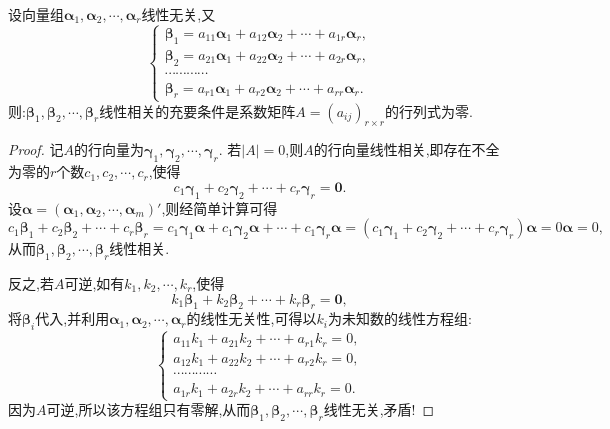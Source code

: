 \documentclass[../../main.tex]{subfiles}%
\begin{document}
\begin{proposition}\label{proposition:线性无关向量组的命题5}
设向量组\(\boldsymbol{\alpha}_1,\boldsymbol{\alpha}_2,\cdots,\boldsymbol{\alpha}_r\)线性无关,又
\[
\begin{cases}
\boldsymbol{\beta}_1 = a_{11}\boldsymbol{\alpha}_1 + a_{12}\boldsymbol{\alpha}_2+\cdots + a_{1r}\boldsymbol{\alpha}_r,\\
\boldsymbol{\beta}_2 = a_{21}\boldsymbol{\alpha}_1 + a_{22}\boldsymbol{\alpha}_2+\cdots + a_{2r}\boldsymbol{\alpha}_r,\\
\cdots\cdots\cdots\cdots\\
\boldsymbol{\beta}_r = a_{r1}\boldsymbol{\alpha}_1 + a_{r2}\boldsymbol{\alpha}_2+\cdots + a_{rr}\boldsymbol{\alpha}_r.
\end{cases}
\]
则:\(\boldsymbol{\beta}_1,\boldsymbol{\beta}_2,\cdots,\boldsymbol{\beta}_r\)线性相关的充要条件是系数矩阵\(A=(a_{ij})_{r\times r}\)的行列式为零.
\end{proposition}
\begin{proof}

记\(A\)的行向量为\(\boldsymbol{\gamma}_1,\boldsymbol{\gamma}_2,\cdots,\boldsymbol{\gamma}_r\). 若\(|A| = 0\),则\(A\)的行向量线性相关,即存在不全为零的\(r\)个数\(c_1,c_2,\cdots,c_r\),使得
\[
c_1\boldsymbol{\gamma}_1 + c_2\boldsymbol{\gamma}_2+\cdots + c_r\boldsymbol{\gamma}_r=\boldsymbol{0}.
\]
设$\boldsymbol{\alpha }=\left( \boldsymbol{\alpha }_1,\boldsymbol{\alpha }_2,\cdots ,\boldsymbol{\alpha }_m \right)'$,则经简单计算可得
\[
c_1\boldsymbol{\beta }_1+c_2\boldsymbol{\beta }_2+\cdots +c_r\boldsymbol{\beta }_r=c_1\boldsymbol{\gamma }_1\boldsymbol{\alpha }+c_1\boldsymbol{\gamma }_2\boldsymbol{\alpha }+\cdots +c_1\boldsymbol{\gamma }_r\boldsymbol{\alpha }=\left( c_1\boldsymbol{\gamma }_1+c_2\boldsymbol{\gamma }_2+\cdots +c_r\boldsymbol{\gamma }_r \right) \boldsymbol{\alpha }=0\boldsymbol{\alpha }=0,
\]
从而\(\boldsymbol{\beta}_1,\boldsymbol{\beta}_2,\cdots,\boldsymbol{\beta}_r\)线性相关.

反之,若\(A\)可逆,如有\(k_1,k_2,\cdots,k_r\),使得
\[
k_1\boldsymbol{\beta}_1 + k_2\boldsymbol{\beta}_2+\cdots + k_r\boldsymbol{\beta}_r=\boldsymbol{0},
\]
将\(\boldsymbol{\beta}_i\)代入,并利用\(\boldsymbol{\alpha}_1,\boldsymbol{\alpha}_2,\cdots,\boldsymbol{\alpha}_r\)的线性无关性,可得以\(k_i\)为未知数的线性方程组:
\[
\begin{cases}
a_{11}k_1 + a_{21}k_2+\cdots + a_{r1}k_r = 0,\\
a_{12}k_1 + a_{22}k_2+\cdots + a_{r2}k_r = 0,\\
\cdots\cdots\cdots\cdots\\
a_{1r}k_1 + a_{2r}k_2+\cdots + a_{rr}k_r = 0.
\end{cases}
\]
因为\(A\)可逆,所以该方程组只有零解,从而\(\boldsymbol{\beta}_1,\boldsymbol{\beta}_2,\cdots,\boldsymbol{\beta}_r\)线性无关,矛盾!

\end{proof}
\end{document}
